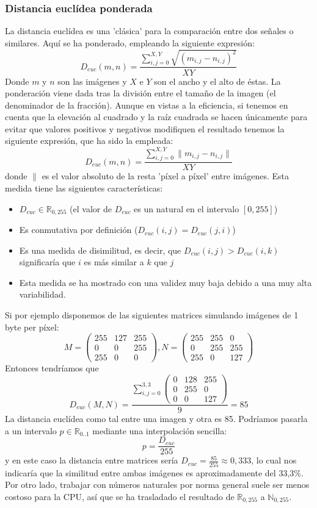 \subsubsection{Distancia euclídea ponderada}
La distancia euclídea es una 'clásica' para la comparación entre dos señales o similares. Aquí se ha ponderado, empleando la siguiente expresión:
\[
D_{euc}(m,n)=\frac{\sum_{i,j=0}^{X,Y}{\sqrt{(m_{i,j}-n_{i,j})^2}}}{XY}
\]
Donde $m$ y $n$ son las imágenes y $X$ e $Y$ son el ancho y el alto de éstas. La ponderación viene dada tras la división entre el tamaño de la imagen (el denominador de la fracción). Aunque en vistas a la eficiencia, si tenemos en cuenta que la elevación al cuadrado y la raíz cuadrada se hacen únicamente para evitar que valores positivos y negativos modifiquen el resultado tenemos la siguiente expresión, que ha sido la empleada:
\[
D_{euc}(m,n)=\frac{\sum_{i,j=0}^{X,Y}{\parallel m_{i,j}-n_{i,j}\parallel}}{XY}
\]
donde $\parallel$ es el valor absoluto de la resta 'píxel a píxel' entre imágenes. Esta medida tiene las siguientes características:
\begin{itemize}
	\item{$D_{euc}\in\mathbb{R}_{0,255}$ (el valor de $D_{euc}$ es un natural en el intervalo $\left[0,255\right]$)} 
	\item{Es conmutativa por definición ($D_{euc}(i,j)=D_{euc}(j,i)$)}
	\item{Es una medida de disimilitud, es decir, que $D_{euc}(i,j) > D_{euc} (i,k)$ significaría que $i$ es más similar a $k$ que $j$}
	\item{Esta medida se ha mostrado con una validez muy baja debido a una muy alta variabilidad.}
\end{itemize}

Si por ejemplo disponemos de las siguientes matrices simulando imágenes de 1 byte per píxel:
\[ M=\left( \begin{array}{lcr}
	255 & 127 & 255 \\
	0 & 0 & 255 \\
	255 & 0 & 0 
\end{array} \right), N=\left( \begin{array}{lcr}
	255 & 255 & 0 \\
	0 & 255 & 255 \\
	255 & 0 & 127 
\end{array} \right) 
\]
Entonces tendríamos que 
\[D_{euc}(M,N) = \frac
	{\sum_{i,j=0}^{3,3}\left( 
		\begin{array}{lcr}
			0 & 128 & 255\\ 0 & 255 & 0 \\ 0 & 0 & 127 
		\end{array} 
	\right)}
	{9} = 85
\]
La distancia euclídea como tal entre una imagen y otra es 85. Podríamos pasarla a un intervalo $p \in \mathbb{R}_{0..1}$ mediante una interpolación sencilla:
\[
	p = \frac{D_{euc}}{255}
\]
y en este caso la distancia entre matrices sería $D_{euc}=\frac{85}{255}\approx0,333$, lo cual nos indicaría que la similitud entre ambas imágenes es aproximadamente del 33,3\%. Por otro lado, trabajar con números naturales por norma general suele ser menos costoso para la CPU, así que se ha trasladado el resultado de $\mathbb{R}_{0,255}$ a $\mathbb{N}_{0,255}$.

